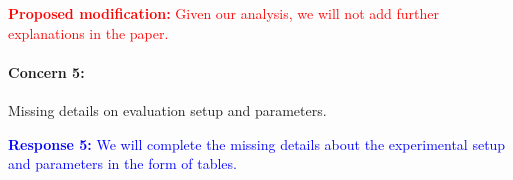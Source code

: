 \documentclass[12pt,one-column]{article}
\begin{document}
\noindent\textcolor{red}{\textbf{Proposed modification: }
Given our analysis, we will not add further explanations in the paper.
}






{\it \paragraph{Concern 5:}Missing details on evaluation setup and parameters.}


\noindent\textcolor{blue}{\textbf{Response 5:}
We will complete the missing details about the experimental setup and parameters in the form of tables.
}
\end{document}
